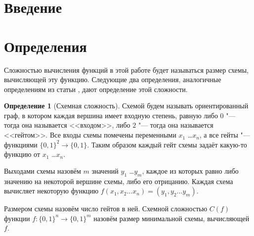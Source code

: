 \documentclass[oneside, a4paper]{article}
\theoremstyle{definition}
\newtheorem{definition}{Определение}
\theoremstyle{remark}
\begin{document}
\title{}
\author{Олейников Иван}
\date{\today}
\maketitle


\tableofcontents

\section{Введение}



\section{Определения}

Сложностью вычисления функций в этой работе будет называться размер схемы,
вычисляющей эту функцию. Следующие два определения, аналогичные определениям из
статьи \cite{hirsch}, дают определение этой сложности.

\begin{definition}[Схемная сложность]
Схемой будем называть ориентированный граф, в котором каждая вершина имеет
входную степень, равную либо $0$ "--- тогда она называется <<входом>>, либо $2$
"--- тогда она называется <<гейтом>>. Все входы схемы помечены переменными $x_1$
\dots $x_n$, а все гейты "--- функциями $\{0, 1\}^2 \to \{0, 1\}$. Таким образом
каждый гейт схемы задаёт какую-то функцию от $x_1$ \dots $x_n$.

Выходами схемы назовём $m$ значений $y_1$ \dots $y_m$, каждое из которых равно
либо значению на некоторой вершине схемы, либо его отрицанию. Каждая схема
вычисляет некоторую функцию $f(x_1, x_2 \dots x_n) = (y_1, y_2 \dots y_m)$.

Размером схемы назовём число гейтов в ней. Схемной сложностью $C(f)$ функции $f
: \{0, 1\}^n \to \{0, 1\}^m$ назовём размер минимальной схемы, вычисляющей $f$.
\end{definition}
\end{document}
